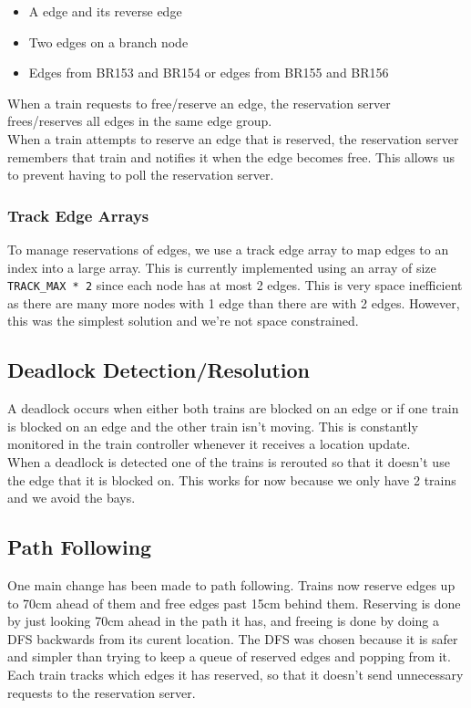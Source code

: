 \documentclass[letterpaper]{article}
\begin{document}
\begin{itemize}
  \item A edge and its reverse edge
  \item Two edges on a branch node
  \item Edges from BR153 and BR154 or edges from BR155 and BR156
\end{itemize}

When a train requests to free/reserve an edge, the reservation server frees/reserves all edges in the same edge group. \\

When a train attempts to reserve an edge that is reserved, the reservation server remembers that train and notifies it when the edge becomes free. This allows us to prevent having to poll the reservation server.

\subsubsection{Track Edge Arrays}

To manage reservations of edges, we use a track edge array to map edges to an index into a large array. This is currently implemented using an array of size {\tt TRACK\_MAX * 2} since each node has at most 2 edges. This is very space inefficient as there are many more nodes with 1 edge than there are with 2 edges. However, this was the simplest solution and we're not space constrained.

\subsection{Deadlock Detection/Resolution}

A deadlock occurs when either both trains are blocked on an edge or if one train is blocked on an edge and the other train isn't moving. This is constantly monitored in the train controller whenever it receives a location update. \\

When a deadlock is detected one of the trains is rerouted so that it doesn't use the edge that it is blocked on. This works for now because we only have 2 trains and we avoid the bays.

\subsection{Path Following}

One main change has been made to path following. Trains now reserve edges up to 70cm ahead of them and free edges past 15cm behind them. Reserving is done by just looking 70cm ahead in the path it has, and freeing is done by doing a DFS backwards from its curent location. The DFS was chosen because it is safer and simpler than trying to keep a queue of reserved edges and popping from it. Each train tracks which edges it has reserved, so that it doesn't send unnecessary requests to the reservation server. \\
\end{document}
